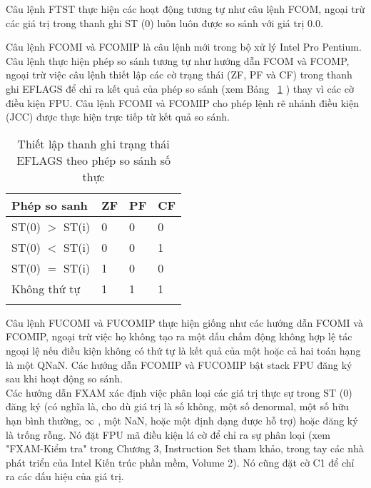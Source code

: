 		Câu lệnh FTST thực hiện các hoạt động tương tự như câu lệnh FCOM, ngoại trừ các giá trị trong thanh ghi ST (0) luôn luôn được so sánh với giá trị 0.0.
		
		Câu lệnh FCOMI và FCOMIP là câu lệnh mới trong bộ xử lý Intel Pro Pentium. Câu lệnh thực hiện phép so sánh tương tự như hướng dẫn FCOM và FCOMP, ngoại trừ việc câu lệnh thiết lập các cờ trạng thái (ZF, PF và CF) trong thanh ghi EFLAGS để chỉ ra kết quả của phép so sánh (xem Bảng ~\ref{tb:EFLAGS} ) thay vì các cờ điều kiện FPU. Câu lệnh FCOMI và FCOMIP cho phép lệnh rẽ nhánh điều kiện (JCC) được thực hiện trực tiếp từ kết quả so sánh.
		\begin{longtable}{|l|l|l|l|}
			\hline
				Phép so sanh & ZF & PF & CF \\
			\hline
			\hline
					ST(0) $>$ ST(i) & 0 & 0 & 0 \\	
			\hline
					ST(0) $<$ ST(i) & 0 & 0 & 1 \\	
			\hline
					ST(0) $=$ ST(i) & 1 & 0 & 0 \\	
			\hline
					Không thứ tự & 1 & 1 & 1 \\	
			\hline
				\caption{Thiết lập thanh ghi trạng thái EFLAGS theo phép so sánh số thực}
				\label{tb:EFLAGS}
		\end{longtable}	
		
		Câu lệnh FUCOMI và FUCOMIP thực hiện giống như các hướng dẫn FCOMI và FCOMIP, ngoại trừ việc họ không tạo ra một dấu chấm động không hợp lệ tác ngoại lệ nếu điều kiện không có thứ tự là kết quả của một hoặc cả hai toán hạng là một QNaN. Các hướng dẫn FCOMIP và FUCOMIP bật stack FPU đăng ký sau khi hoạt động so sánh.\\
		
		Các hướng dẫn FXAM xác định việc phân loại các giá trị thực sự trong ST (0) đăng ký (có nghĩa là, cho dù giá trị là số không, một số denormal, một số hữu hạn bình thường, $\mathbb{\infty}$ , một NaN, hoặc một định dạng được hỗ trợ) hoặc đăng ký là trống rỗng. Nó đặt FPU mã điều kiện lá cờ để chỉ ra sự phân loại (xem "FXAM-Kiểm tra" trong Chương 3, Instruction Set tham khảo, trong tay các nhà phát triển của Intel Kiến trúc phần mềm, Volume 2). Nó cũng đặt cờ C1 để chỉ ra các dấu hiệu của giá trị.
		
